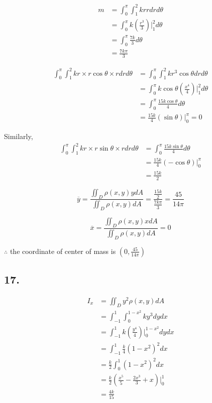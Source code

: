 \documentclass{article}
\begin{document}
   $$\begin{aligned}
     m &= \int_0^\pi \int_1^2 kr r dr d\theta \\
     &= \int_0^{\pi} k(\frac{r^3}{3})\biggl|_1^2 d\theta \\
     &= \int_0^{\pi} \frac{7k}{3} d\theta \\
     &= \frac{7k\pi}{3}
   \end{aligned}$$

   $$\begin{aligned}
     \int_0^\pi \int_1^2 kr \times r\cos \theta \times rdr d\theta &= \int_0^\pi \int_1^2 kr^3\cos \theta dr d\theta \\
     &= \int_0^\pi k\cos \theta(\frac{x^4}{4})\biggl|_1^2 d\theta \\
     &= \int_0^\pi \frac{15k\cos \theta}{4} d\theta \\
     &= \frac{15k}{4} (\sin \theta)\biggl|_0^\pi = 0
   \end{aligned}$$

   Similarly,
   $$\begin{aligned}
     \int_0^\pi \int_1^2 kr \times r\sin \theta \times rdrd\theta &= \int_0^\pi \frac{15k\sin \theta}{4}d\theta \\
     &= \frac{15k}{4} (-\cos \theta)\biggl|_0^\pi \\
     &= \frac{15k}{2}
   \end{aligned}$$

   $$\overline y = \frac{\iint_D \rho(x, y) y dA}{\iint_D \rho(x, y) dA} = \frac{\frac{15k}{2}}{\frac{7k\pi}{3}} = \frac{45}{14\pi}$$

   $$\overline x = \frac{\iint_D \rho(x, y) x dA}{\iint_D \rho(x, y) dA} = 0$$

   $\therefore$ the coordinate of center of mass is $(0, \frac{45}{14\pi})$

  \subsection*{17. }

   $$\begin{aligned}
     I_x &= \iint_D y^2 \rho(x, y) dA \\
     &= \int_{-1}^1 \int_0^{1-x^2} ky^3 dy dx \\
     &= \int_{-1}^1 k(\frac{y^4}{4})\biggl|_0^{1-x^2} dy dx \\
     &= \int_{-1}^1 \frac{k}{4}(1-x^2)^2 dx \\
     &= \frac k 2 \int_0^1 (1-x^2)^2 dx \\
     &= \frac k 2 (\frac{x^5}{5} - \frac{2x^3}{3} + x)\biggl|_0^1 \\
     &= \frac{4k}{15}
   \end{aligned}$$
\end{document}
